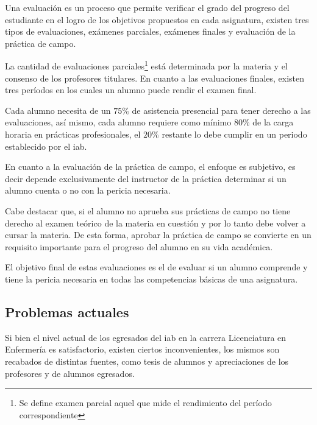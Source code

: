 Una evaluación es un proceso que permite verificar el grado del progreso del
estudiante en el logro de los objetivos propuestos en cada
asignatura\cite{iab:est_enfemeria}, existen tres tipos de evaluaciones, exámenes
parciales, exámenes finales y evaluación de la práctica de campo.

La cantidad de evaluaciones parciales\footnote{Se
    define examen parcial aquel que mide el rendimiento del período
    correspondiente\cite{iab:est_enfemeria}} está determinada por la materia y el
consenso de los profesores titulares\cite{iab:est_enfemeria}. En cuanto a las 
evaluaciones finales, existen tres períodos en los cuales un alumno puede rendir 
el examen final.


Cada alumno necesita de un $75\%$ de asistencia presencial para tener derecho a
las evaluaciones, así mismo, cada alumno requiere como mínimo $80\%$ de la carga
horaria en prácticas profesionales, el $20\%$ restante lo debe cumplir en un
periodo establecido por el \Gls{iab}.

En cuanto a la evaluación de la práctica de campo, el enfoque es
subjetivo, es decir depende exclusivamente del instructor de la práctica
determinar si un alumno cuenta o no con la pericia necesaria.
    
Cabe destacar que, si el alumno no aprueba sus prácticas de campo no tiene 
derecho al examen teórico de la materia en cuestión y por lo tanto debe volver 
a cursar la materia. De esta forma, aprobar la práctica de campo se convierte 
en un requisito importante para el progreso del alumno en su vida académica.

El objetivo final de estas evaluaciones es el de evaluar si un alumno comprende
y tiene la pericia necesaria en todas las competencias básicas de una
asignatura.



\subsection{Problemas actuales}
\label{sec:problemas_actuales}

Si bien el nivel actual de los egresados del \Gls{iab} en la carrera
Licenciatura en Enfermería es satisfactorio, existen ciertos inconvenientes, los
mismos son recabados de distintas fuentes, como tesis de
alumnos\cite{iab:tesis_atencion,iab:tesis_alumnos} y apreciaciones de los
profesores y de alumnos egresados.

